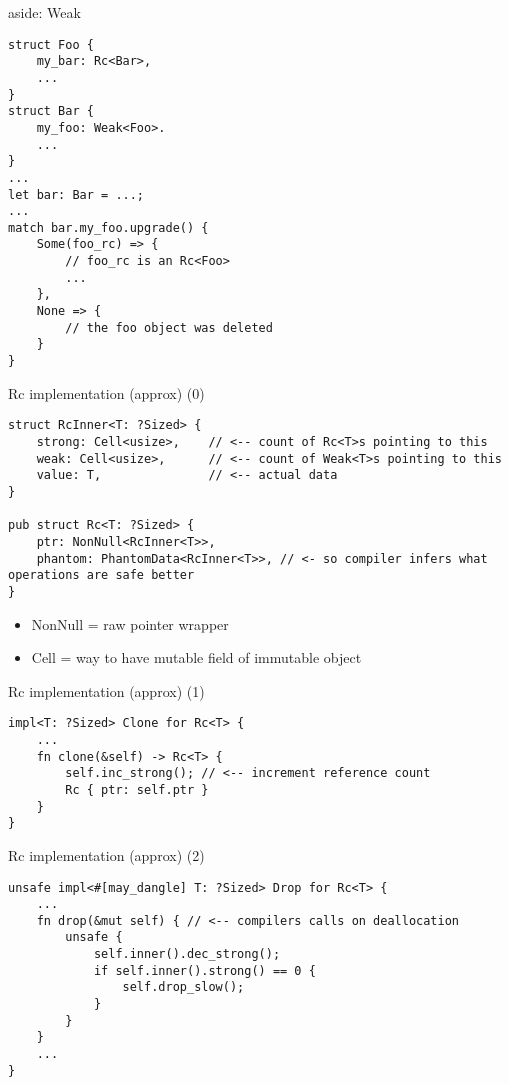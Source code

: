 \begin{frame}[fragile]{aside: Weak}
\begin{verbatim}
struct Foo {
    my_bar: Rc<Bar>,
    ...
}
struct Bar {
    my_foo: Weak<Foo>.
    ...
}
...
let bar: Bar = ...;
...
match bar.my_foo.upgrade() {
    Some(foo_rc) => {
        // foo_rc is an Rc<Foo>
        ...
    },
    None => {
        // the foo object was deleted
    }
}
\end{verbatim}
\end{frame}



\begin{frame}[fragile,label=rcImplA]{Rc implementation (approx) (0)}
\begin{verbatim}
struct RcInner<T: ?Sized> {
    strong: Cell<usize>,    // <-- count of Rc<T>s pointing to this
    weak: Cell<usize>,      // <-- count of Weak<T>s pointing to this
    value: T,               // <-- actual data
}

pub struct Rc<T: ?Sized> {
    ptr: NonNull<RcInner<T>>,
    phantom: PhantomData<RcInner<T>>, // <- so compiler infers what operations are safe better
}
\end{verbatim}
\begin{itemize}
\item NonNull = raw pointer wrapper
\item Cell = way to have mutable field of immutable object
\end{itemize}
\end{frame}



\begin{frame}[fragile,label=rcImplA]{Rc implementation (approx) (1)}
\begin{verbatim}
impl<T: ?Sized> Clone for Rc<T> {
    ... 
    fn clone(&self) -> Rc<T> {
        self.inc_strong(); // <-- increment reference count
        Rc { ptr: self.ptr }
    }
}
\end{verbatim}
\end{frame}

\begin{frame}[fragile,label=rcImplB]{Rc implementation (approx) (2)}
\begin{verbatim}
unsafe impl<#[may_dangle] T: ?Sized> Drop for Rc<T> {
    ...
    fn drop(&mut self) { // <-- compilers calls on deallocation
        unsafe {
            self.inner().dec_strong();
            if self.inner().strong() == 0 {
                self.drop_slow();
            }
        }
    }
    ...
}
\end{verbatim}
\end{frame}

